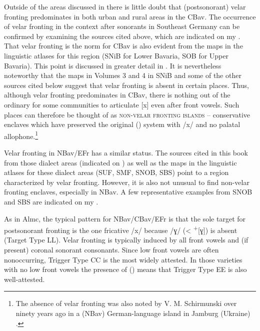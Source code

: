 Outside of the areas discussed in \citet{Ibrom1971} there is little doubt that (postsonorant) velar fronting predominates in both urban and rural areas in the CBav. The occurrence of velar fronting in the context after sonorants in Southeast Germany can be confirmed by examining the sources cited above, which are indicated on my . That velar fronting is the norm for CBav is also evident from the maps in the linguistic atlases for this region (SNiB for Lower Bavaria, SOB for Upper Bavaria). This point is discussed in greater detail in . It is nevertheless noteworthy that the maps in Volumes 3 and 4 in SNiB and some of the other sources cited below suggest that velar fronting is absent in certain places. Thus, although velar fronting predominates in CBav, there is nothing out of the ordinary for some communities to articulate [x] even after front vowels. Such places can therefore be thought of as \textsc{{non-velar} \textsc{fronting} \textsc{islands}} \textsc{--} conservative enclaves which have preserved the original () system with /x/ and no palatal allophone.\footnote{The absence of velar fronting was also noted by V. M. Schirmunski over ninety years ago in a (NBav) German-language island in Jamburg (Ukraine) \citep[255]{Schirmunski1931}.}

Velar fronting in NBav/EFr has a similar status. The sources cited in this book from those dialect areas (indicated on ) as well as the maps in the linguistic atlases for these dialect areas (SUF, SMF, SNOB, SBS) point to a region characterized by velar fronting. However, it is also not unusual to find non-velar fronting enclaves, especially in NBav. A few representative examples from SNOB and SBS are indicated on my .

As in Almc, the typical pattern for NBav/CBav/EFr is that the sole target for postsonorant fronting is the one fricative /x/ because /ɣ/ (<  \textsuperscript{+}[ɣ]) is absent (Target Type LL). Velar fronting is typically induced by all front vowels and (if present) coronal sonorant consonants. Since low front vowels are often nonoccurring, Trigger Type CC is the most widely attested. In those varieties with no low front vowels the presence of  () means that Trigger Type EE is also well-attested.

